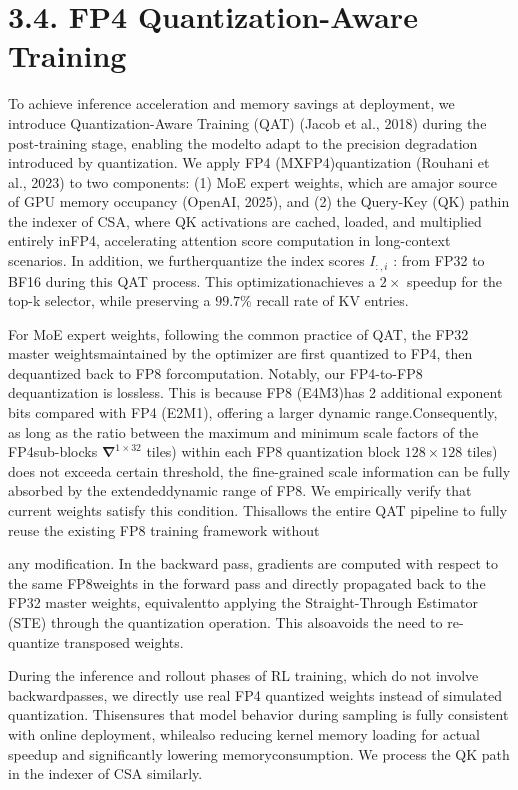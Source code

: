 \documentclass[
  10
]{article}
\begin{document}
\section{3.4. FP4 Quantization-Aware
Training}\label{fp4-quantization-aware-training}

To achieve inference acceleration and memory savings at deployment, we
introduce Quantization-Aware Training (QAT) (Jacob et al., 2018) during
the post-training stage, enabling the modelto adapt to the precision
degradation introduced by quantization. We apply FP4 (MXFP4)quantization
(Rouhani et al., 2023) to two components: (1) MoE expert weights, which
are amajor source of GPU memory occupancy (OpenAI, 2025), and (2) the
Query-Key (QK) pathin the indexer of CSA, where QK activations are
cached, loaded, and multiplied entirely inFP4, accelerating attention
score computation in long-context scenarios. In addition, we
furtherquantize the index scores \(I _ { : , i }\) : from FP32 to BF16
during this QAT process. This optimizationachieves a \(2 \times\)
speedup for the top-k selector, while preserving a \(9 9 . 7 \%\) recall
rate of KV entries.

For MoE expert weights, following the common practice of QAT, the FP32
master weightsmaintained by the optimizer are first quantized to FP4,
then dequantized back to FP8 forcomputation. Notably, our FP4-to-FP8
dequantization is lossless. This is because FP8 (E4M3)has 2 additional
exponent bits compared with FP4 (E2M1), offering a larger dynamic
range.Consequently, as long as the ratio between the maximum and minimum
scale factors of the FP4sub-blocks
\(\mathbf { \nabla } ^ { 1 \times 3 2 }\) tiles) within each FP8
quantization block \(1 2 8 \times 1 2 8\) tiles) does not exceeda
certain threshold, the fine-grained scale information can be fully
absorbed by the extendeddynamic range of FP8. We empirically verify that
current weights satisfy this condition. Thisallows the entire QAT
pipeline to fully reuse the existing FP8 training framework without

any modification. In the backward pass, gradients are computed with
respect to the same FP8weights in the forward pass and directly
propagated back to the FP32 master weights, equivalentto applying the
Straight-Through Estimator (STE) through the quantization operation.
This alsoavoids the need to re-quantize transposed weights.

During the inference and rollout phases of RL training, which do not
involve backwardpasses, we directly use real FP4 quantized weights
instead of simulated quantization. Thisensures that model behavior
during sampling is fully consistent with online deployment, whilealso
reducing kernel memory loading for actual speedup and significantly
lowering memoryconsumption. We process the QK path in the indexer of CSA
similarly.
\end{document}
